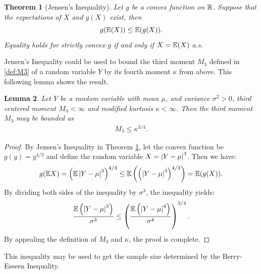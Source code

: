 \documentclass{iitthesis}
\newtheorem{theorem}{Theorem}[section]
\newtheorem{lemma}[theorem]{Lemma}
\theoremstyle{definition}
\begin{document}
\begin{theorem}[Jensen's Inequality{\cite[8.4a]{LB10}}]\label{Jensen}
Let $g$ be a convex function on $\mathbb{R}$. Suppose that the expectations of $X$ and $g(X)$ exist, then
$$g(\mathbb{E}(X)) \leq \mathbb{E}(g(X)).$$
Equality holds for strictly convex $g$ if and only if $X=\mathbb{E}(X)$ a.s.
\end{theorem}
Jensen's Inequality could be used to bound the third moment $M_3$ defined in \eqref{def:M3} of a random variable $Y$ by its fourth moment $\kappa$ from above. This following lemma shows the result.
\begin{lemma}\label{M3kappalemma}
Let $Y$ be a random variable with mean $\mu$, and variance $\sigma^2>0$, third centered moment $M_3 < \infty$ and modified kurtosis $\kappa < \infty$. Then the third moment $M_3$ may be bounded as 
\begin{align}\label{M3kappa}
M_3\leq \kappa^{3/4}.
\end{align}
\end{lemma}
\begin{proof}
By Jensen's Inequality in Theorem \ref{Jensen}, let the convex function be $g(y) = y^{4/3}$ and define the random variable $X = \left \lvert Y-\mu \right \rvert^3$. Then we have:
$$g(\mathbb{E} X) = \left (\mathbb{E}\left \lvert Y-\mu \right \rvert^3\right)^{4/3} \leq \mathbb{E}\left(\left(\left \lvert Y-\mu \right \rvert^3\right)^{4/3}\right) = \mathbb{E}(g(X)).$$
By dividing both sides of the inequality by $\sigma^3$, the inequality yields:
$$\frac{\mathbb{E}\left(\left \lvert Y-\mu \right \rvert^3\right)}{\sigma^3} \leq \left (\frac{\mathbb{E}\left(\left \lvert Y-\mu \right \rvert^4\right)}{\sigma^4}\right)^{3/4}.$$
By appealing the definition of $M_3$ and $\kappa$, the proof is complete.
\end{proof}
This inequality may be used to get the sample size determined by the Berry-Esseen Inequality.

\end{document}
